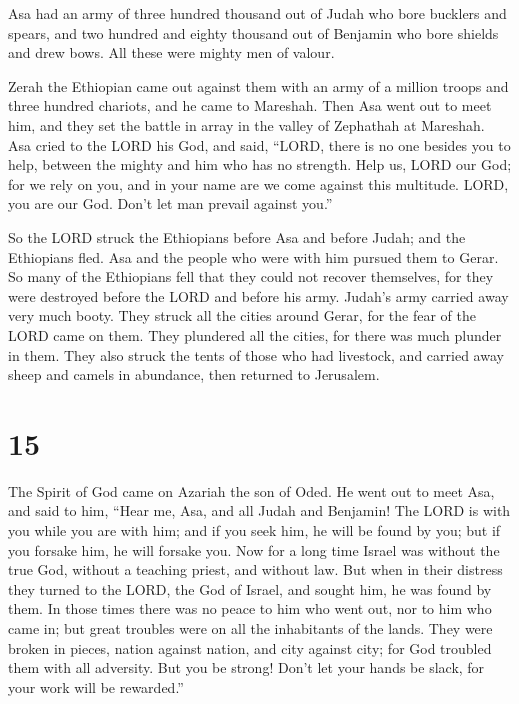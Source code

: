  Asa had an army of three hundred thousand out of Judah
who bore bucklers and spears, and two hundred and eighty thousand out of
Benjamin who bore shields and drew bows. All these were mighty men of
valour.

 Zerah the Ethiopian came out against them with an army of
a million troops and three hundred chariots, and he came to Mareshah.
 Then Asa went out to meet him, and they set the battle
in array in the valley of Zephathah at Mareshah.  Asa
cried to the LORD his God, and said, ``LORD, there is no one besides you
to help, between the mighty and him who has no strength. Help us, LORD
our God; for we rely on you, and in your name are we come against this
multitude. LORD, you are our God. Don't let man prevail against you.''

 So the LORD struck the Ethiopians before Asa and before
Judah; and the Ethiopians fled.  Asa and the people who
were with him pursued them to Gerar. So many of the Ethiopians fell that
they could not recover themselves, for they were destroyed before the
LORD and before his army. Judah's army carried away very much booty.
 They struck all the cities around Gerar, for the fear of
the LORD came on them. They plundered all the cities, for there was much
plunder in them.  They also struck the tents of those who
had livestock, and carried away sheep and camels in abundance, then
returned to Jerusalem.

\hypertarget{section-14}{%
\section{15}\label{section-14}}

 The Spirit of God came on Azariah the son of Oded.
 He went out to meet Asa, and said to him, ``Hear me, Asa,
and all Judah and Benjamin! The LORD is with you while you are with him;
and if you seek him, he will be found by you; but if you forsake him, he
will forsake you.  Now for a long time Israel was without
the true God, without a teaching priest, and without law. 
But when in their distress they turned to the LORD, the God of Israel,
and sought him, he was found by them.  In those times
there was no peace to him who went out, nor to him who came in; but
great troubles were on all the inhabitants of the lands. 
They were broken in pieces, nation against nation, and city against
city; for God troubled them with all adversity.  But you
be strong! Don't let your hands be slack, for your work will be
rewarded.''

